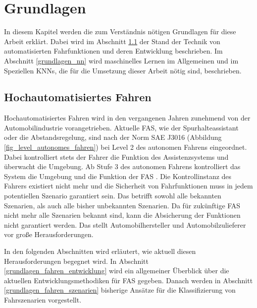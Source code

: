 
\chapter{Grundlagen}
\label{grundlagen}

In diesem Kapitel werden die zum Verständnis nötigen Grundlagen für diese Arbeit erklärt. Dabei wird im Abschnitt \ref{grundlagen_fahren} der Stand der Technik von automatisierten Fahrfunktionen und deren Entwicklung beschrieben. Im Abschnitt \ref{grundlagen_nn} wird maschinelles Lernen im Allgemeinen und im Speziellen \acp{KNN}, die für die Umsetzung dieser Arbeit nötig sind, beschrieben.

\section{Hochautomatisiertes Fahren}
\label{grundlagen_fahren}

Hochautomatisiertes Fahren wird in den vergangenen Jahren zunehmend von der Automobilindustrie vorangetrieben. Aktuelle \ac{FAS}, wie der Spurhalteassistant oder die Abstandsregelung, sind nach der Norm SAE J3016 (Abbildung \ref{fig_level_autonomes_fahren}) bei Level 2 des autonomen Fahrens eingeordnet. Dabei kontrolliert stets der Fahrer die Funktion des Assistenzsystems und überwacht die Umgebung. Ab Stufe 3 des autonomen Fahrens kontrolliert das System die Umgebung und die Funktion der \ac{FAS} \cite{sae2014taxonomy}. Die Kontrollinstanz des Fahrers existiert nicht mehr und die Sicherheit von Fahrfunktionen muss in jedem potentiellen Szenario garantiert sein. Das betrifft sowohl alle bekannten Szenarien, als auch alle bisher unbekannten Szenarien. Da für zukünftige \ac{FAS} nicht mehr alle Szenarien bekannt sind, kann die Absicherung der Funktionen nicht garantiert werden. Das stellt Automobilhersteller und Automobilzulieferer vor große Herausforderungen.


In den folgenden Abschnitten wird erläutert, wie aktuell diesen Herausforderungen begegnet wird. In Abschnitt \ref{grundlagen_fahren_entwicklung} wird ein allgemeiner Überblick über die aktuellen Entwicklungsmethodiken für \ac{FAS} gegeben. Danach werden in Abschnitt \ref{grundlagen_fahren_szenarien} bisherige Ansätze für die Klassifizierung von Fahrszenarien vorgestellt.

